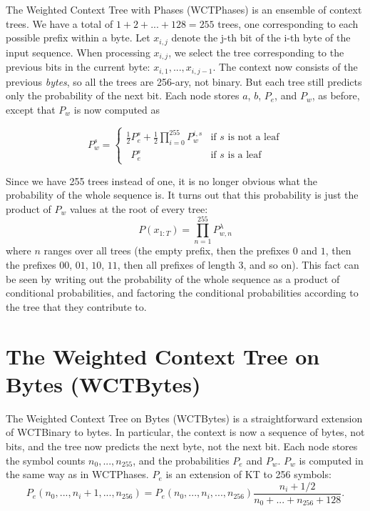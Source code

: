 \documentclass[11pt]{scrartcl}
\begin{document}
The Weighted Context Tree with Phases (WCTPhases) is an ensemble of context
trees. We have a total of $1 + 2 + ... + 128 = 255$ trees, one corresponding to
each possible prefix within a byte. Let $x_{i,j}$ denote the j-th bit of the
i-th byte of the input sequence.  When processing $x_{i,j}$, we select the tree
corresponding to the previous bits in the current byte: $x_{i,1}, ...,
x_{i,j-1}$. The context now consists of the previous {\em bytes}, so all the
trees are 256-ary, not binary. But each tree still predicts only the
probability of the next bit. Each node stores $a$, $b$, $P_e$, and $P_w$, as
before, except that $P_w$ is now computed as

\[
P_w^s =
\left\{
\begin{array}{ll}
\frac{1}{2} P_e^s + \frac{1}{2} \prod_{i=0}^{255}{ P_w^{i,s} }
    & \mbox{if $s$ is not a leaf} \\
\phantom{\frac{1}{2}} P_e^s
    & \mbox{if $s$ is a leaf}
\end{array}
\right.
\]

Since we have 255 trees instead of one, it is no longer obvious what the
probability of the whole sequence is. It turns out that this probability is
just the product of $P_w$ values at the root of every tree:
\[
P(x_{1:T}) = \prod_{n=1}^{255} P_{w, n}^\lambda
\]
where $n$ ranges over all trees (the empty prefix, then the prefixes $0$ and
$1$, then the prefixes $00$, $01$, $10$, $11$, then all prefixes of length 3,
and so on). This fact can be seen by writing out the probability of the whole
sequence as a product of conditional probabilities, and factoring the
conditional probabilities according to the tree that they contribute to.


\section{The Weighted Context Tree on Bytes (WCTBytes)}
\label{sec:wct-bytes}

The Weighted Context Tree on Bytes (WCTBytes) is a straightforward extension of
WCTBinary to bytes. In particular, the context is now a sequence of bytes, not
bits, and the tree now predicts the next byte, not the next bit. Each node
stores the symbol counts $n_0, ..., n_{255}$, and the probabilities $P_e$ and
$P_w$. $P_w$ is computed in the same way as in WCTPhases. $P_e$ is an
extension of KT to 256 symbols:
\[
P_e(n_0, ..., n_i + 1, ..., n_{256}) =
P_e(n_0, ..., n_i, ..., n_{256})
\frac{ n_i + 1/2 }{ n_0 + ... + n_{256} + 128 }.
\]
\end{document}
